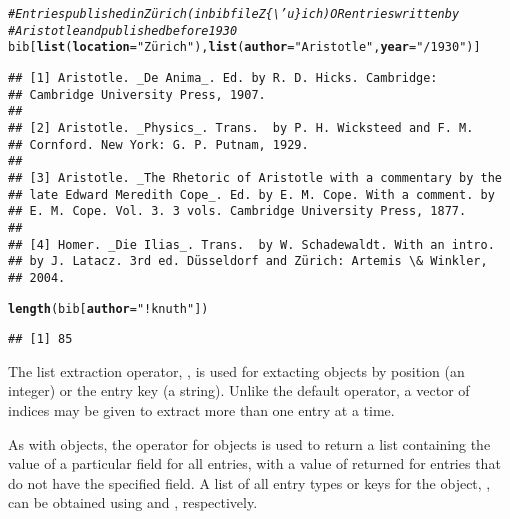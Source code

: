 \documentclass[article]{jss}\usepackage[]{graphicx}\usepackage[]{color}
\makeatletter
\newcommand{\hlstr}[1]{\textcolor[rgb]{0.125,0.125,1}{#1}}%
\newcommand{\hlcom}[1]{\textcolor[rgb]{1,0,0.753}{\textit{#1}}}%
\newcommand{\hlstd}[1]{\textcolor[rgb]{0.251,0.251,0.282}{#1}}%
\newcommand{\hlkwc}[1]{\textcolor[rgb]{0.529,0,0.184}{\textbf{#1}}}%
\newcommand{\hlkwd}[1]{\textcolor[rgb]{0.251,0.251,0.282}{\textbf{#1}}}%
\newenvironment{kframe}{%
 \def\at@end@of@kframe{}%
 \ifinner\ifhmode%
  \def\at@end@of@kframe{\end{minipage}}%
  \begin{minipage}{\columnwidth}%
 \fi\fi%
 \def\FrameCommand##1{\hskip\@totalleftmargin \hskip-\fboxsep
 \colorbox{shadecolor}{##1}\hskip-\fboxsep
     \hskip-\linewidth \hskip-\@totalleftmargin \hskip\columnwidth}%
 \MakeFramed {\advance\hsize-\width
   \@totalleftmargin\z@ \linewidth\hsize
   \@setminipage}}%
 {\par\unskip\endMakeFramed%
 \at@end@of@kframe}
\newenvironment{knitrout}{}{} %
\newcommand{\bt}{\`{}}
\makeatother
\begin{document}
\begin{knitrout}
\color{fgcolor}\begin{kframe}
\begin{alltt}
\hlcom{# Entries published in Zürich (in bib file Z\{\textbackslash{}'u\}ich) OR entries written by}
\hlcom{# Aristotle and published before 1930}
\hlstd{bib[}\hlkwd{list}\hlstd{(}\hlkwc{location} \hlstd{=} \hlstr{"Zürich"}\hlstd{),} \hlkwd{list}\hlstd{(}\hlkwc{author} \hlstd{=} \hlstr{"Aristotle"}\hlstd{,} \hlkwc{year} \hlstd{=} \hlstr{"/1930"}\hlstd{)]}
\end{alltt}
\begin{verbatim}
## [1] Aristotle. _De Anima_. Ed. by R. D. Hicks. Cambridge:
## Cambridge University Press, 1907.
## 
## [2] Aristotle. _Physics_. Trans.  by P. H. Wicksteed and F. M.
## Cornford. New York: G. P. Putnam, 1929.
## 
## [3] Aristotle. _The Rhetoric of Aristotle with a commentary by the
## late Edward Meredith Cope_. Ed. by E. M. Cope. With a comment. by
## E. M. Cope. Vol. 3. 3 vols. Cambridge University Press, 1877.
## 
## [4] Homer. _Die Ilias_. Trans.  by W. Schadewaldt. With an intro.
## by J. Latacz. 3rd ed. Düsseldorf and Zürich: Artemis \& Winkler,
## 2004.
\end{verbatim}
\begin{alltt}
\hlkwd{length}\hlstd{(bib[}\hlkwc{author} \hlstd{=} \hlstr{"!knuth"}\hlstd{])}
\end{alltt}
\begin{verbatim}
## [1] 85
\end{verbatim}
\end{kframe}
\end{knitrout}

The list extraction operator, \code{\bt[[\bt}, is used for extacting  objects by position (an integer) or the entry key (a string).  Unlike the default operator, a vector of indices may be given to extract more than one entry at a time.

As with  objects, the \code{\bt$\bt} operator for  objects is used to return a list containing the value of a particular field for all entries, with a value of  returned for entries that do not have the specified field.  A list of all entry types or keys for the  object, , can be obtained using  and , respectively.
\end{document}
